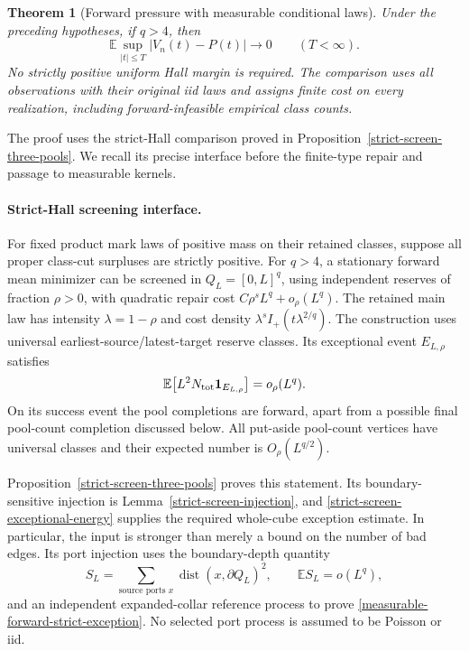 \documentclass[11pt,reqno]{amsart}
\newtheorem{theorem}{Theorem}[section]
\theoremstyle{definition}
\theoremstyle{remark}
\numberwithin{equation}{section}
\newcommand{\E}{\mathbb E}
\begin{document}
\begin{theorem}[Forward pressure with measurable conditional laws]
\label{measurable-forward-pressure}
Under the preceding hypotheses, if \(q>4\), then
\[
             \E\sup_{|t|\le T}|V_n(t)-P(t)|\longrightarrow0
             \qquad(T<\infty).
\]
No strictly positive uniform Hall margin is required. The comparison
uses all observations with their original iid laws and assigns finite
cost on every realization, including forward-infeasible empirical
class counts.
\end{theorem}

The proof uses the strict-Hall comparison proved in
Proposition~\ref{strict-screen-three-pools}. We recall its precise
interface before the finite-type repair and passage to measurable kernels.

\paragraph{Strict-Hall screening interface.}
\label{measurable-forward-strict-input}
For fixed product mark laws of positive mass on their retained classes,
suppose all proper class-cut surpluses are strictly positive.
For \(q>4\), a stationary forward mean minimizer can be screened in
\(Q_L=[0,L]^q\), using independent reserves of fraction \(\rho>0\),
with quadratic repair cost
\(C\rho^sL^q+o_\rho(L^q)\). The retained main law has intensity
\(\lambda=1-\rho\) and cost density
\(\lambda^s I_+(t\lambda^{2/q})\).
The construction uses universal earliest-source/latest-target reserve
classes. Its exceptional event \(E_{L,\rho}\) satisfies
\begin{equation}
\label{measurable-forward-strict-exception}
 \E\!\left[L^2N_{\rm tot}\mathbf1_{E_{L,\rho}}\right]
                         =o_\rho(L^q).
\end{equation}
On its success event the pool completions are forward, apart from
a possible final pool-count completion discussed below. All put-aside
pool-count vertices have universal classes and their expected number
is \(O_\rho(L^{q/2})\).

Proposition~\ref{strict-screen-three-pools} proves this statement.
Its boundary-sensitive injection is Lemma~\ref{strict-screen-injection},
and \eqref{strict-screen-exceptional-energy} supplies the required
whole-cube exception estimate.
In particular, the input is stronger than merely a bound on the number
of bad edges. Its port injection uses the boundary-depth quantity
\[
 S_L=\sum_{\text{source ports }x}
          \operatorname{dist}(x,\partial Q_L)^2,\qquad
 \E S_L=o(L^q),
\]
and an independent expanded-collar reference process to prove
\eqref{measurable-forward-strict-exception}. No selected port process
is assumed to be Poisson or iid.
\end{document}
